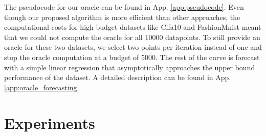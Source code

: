 \documentclass[]{article}
\newcommand{\LL}{\mathcal{L}}
\begin{document}
The pseudocode for our oracle can be found in App. \ref{app:pseudocode}.
Even though our proposed algorithm is more efficient than other approaches, the computational costs for high budget datasets like Cifa10 and FashionMnist meant that we could not compute the oracle for all 10000 datapoints.
To still provide an oracle for these two datasets, we select two points per iteration instead of one and stop the oracle computation at a budget of 5000.
The rest of the curve is forecast with a simple linear regression that asymptotically approaches the upper bound performance of the dataset. 
A detailed description can be found in App. \ref{app:oracle_forecasting}.

\section{Experiments}
\end{document}
